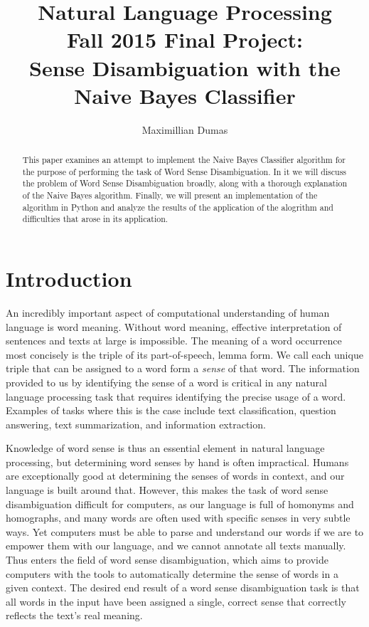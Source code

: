 \documentclass[11pt]{article}
\title{Natural Language Processing\\
Fall 2015 Final Project:\\
Sense Disambiguation with the\\
Naive Bayes Classifier}
\author{Maximillian Dumas}
\begin{document}
\maketitle

\begin{abstract}
This paper examines an attempt to implement the Naive Bayes Classifier algorithm for the purpose of performing the task of Word Sense Disambiguation. In it we will discuss the problem of Word Sense Disambiguation broadly, along with a thorough explanation of the Naive Bayes algorithm. Finally, we will present an implementation of the algorithm in Python and analyze the results of the application of the alogrithm and difficulties that arose in its application.
\end{abstract}

\section{Introduction}
An incredibly important aspect of computational understanding of human language is word meaning. Without word meaning, effective interpretation of sentences and texts at large is impossible. The meaning of a word occurrence most concisely is the triple of its part-of-speech, lemma form. We call each unique triple that can be assigned to a word form a \emph{sense} of that word. The information provided to us by identifying the sense of a word is critical in any natural language processing task that requires identifying the precise usage of a word. Examples of tasks where this is the case include text classification, question answering, text summarization, and information extraction.

Knowledge of word sense is thus an essential element in natural language processing, but determining word senses by hand is often impractical. Humans are exceptionally good at determining the senses of words in context, and our language is built around that. However, this makes the task of word sense disambiguation difficult for computers, as our language is full of homonyms and homographs, and many words are often used with specific senses in very subtle ways. Yet computers must be able to parse and understand our words if we are to empower them with our language, and we cannot annotate all texts manually. Thus enters the field of word sense disambiguation, which aims to provide computers with the tools to automatically determine the sense of words in a given context. The desired end result of a word sense disambiguation task is that all words in the input have been assigned a single, correct sense that correctly reflects the text's real meaning.
\end{document}
